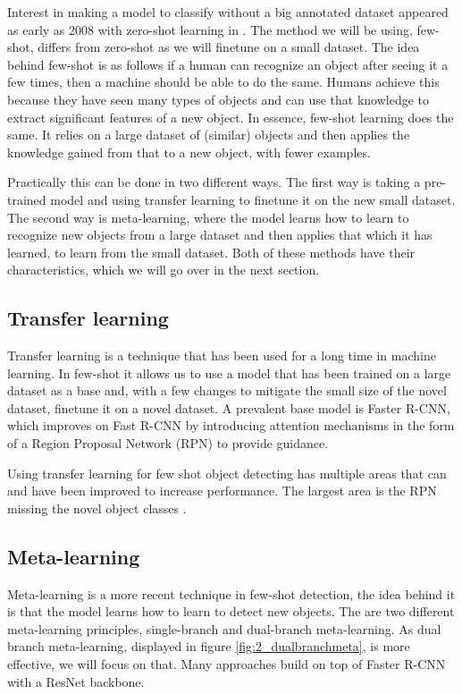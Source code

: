 Interest in making a model to classify without a big annotated dataset appeared as early as 2008 with zero-shot learning in \citet{aaai08-132}. The method we will be using, few-shot, differs from zero-shot as we will finetune on a small dataset. The idea behind few-shot is as follows if a human can recognize an object after seeing it a few times, then a machine should be able to do the same. Humans achieve this because they have seen many types of objects and can use that knowledge to extract significant features of a new object\cite{biederman1987recognition}. In essence, few-shot learning does the same. It relies on a large dataset of (similar) objects and then applies the knowledge gained from that to a new object, with fewer examples.

Practically this can be done in two different ways. The first way is taking a pre-trained model and using transfer learning to finetune it on the new small dataset. The second way is meta-learning, where the model learns how to learn to recognize new objects from a large dataset and then applies that which it has learned, to learn from the small dataset. Both of these methods have their characteristics, which we will go over in the next section.

\subsection{Transfer learning}
Transfer learning is a technique that has been used for a long time in machine learning. In few-shot it allows us to use a model that has been trained on a large dataset as a base and, with a few changes to mitigate the small size of the novel dataset, finetune it on a novel dataset. A prevalent base model is Faster R-CNN\cite{fasterrcnn}, which improves on Fast R-CNN\cite{fastrcnn} by introducing attention mechanisms in the form of a Region Proposal Network (RPN) to provide guidance.

Using transfer learning for few shot object detecting has multiple areas that can and have been improved to increase performance. The largest area is the RPN missing the novel object classes \cite{DBLP:journals/corr/abs-2011-10142, VU2022104398, DBLP:journals/corr/abs-2105-09491, DBLP:journals/corr/abs-2103-05950,rs14143255}.
\subsection{Meta-learning}
Meta-learning is a more recent technique in few-shot detection, the idea behind it is that the model learns how to learn to detect new objects. The are two different meta-learning principles, single-branch and dual-branch meta-learning. As dual branch meta-learning, displayed in figure \ref{fig:2_dualbranchmeta}, is more effective, we will focus on that. Many approaches build on top of Faster R-CNN with a ResNet backbone.\cite{few-shot-comprehensive-survey} %

